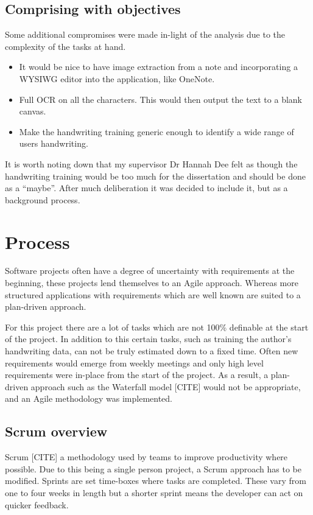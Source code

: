 \subsection{Comprising with objectives}
Some additional compromises were made in-light of the analysis due to the complexity of the tasks at hand.
\begin{itemize}
	\item It would be nice to have image extraction from a note and incorporating a WYSIWG editor into the application, like OneNote.
	\item Full OCR on all the characters. This would then output the text to a blank canvas.
	\item Make the handwriting training generic enough to identify a wide range of users handwriting.
\end{itemize}

It is worth noting down that my supervisor Dr Hannah Dee felt as though the handwriting training would be too much for the dissertation and should be done as a ``maybe''. After much deliberation it was decided to include it, but as a background process.

\section{Process}
Software projects often have a degree of uncertainty with requirements at the beginning, these projects lend themselves to an Agile approach. Whereas more structured applications with requirements which are well known are suited to a plan-driven approach.

For this project there are a lot of tasks which are not 100\% definable at the start of the project. In addition to this certain tasks, such as training the author's handwriting data, can not be truly estimated down to a fixed time. Often new requirements would emerge from weekly meetings and only high level requirements were in-place from the start of the project. As a result, a plan-driven approach such as the Waterfall model [CITE] would not be appropriate, and an Agile methodology was implemented.

\subsection{Scrum overview}
Scrum [CITE] a methodology used by teams to improve productivity where possible. Due to this being a single person project, a Scrum approach has to be modified. Sprints are set time-boxes where tasks are completed. These vary from one to four weeks in length but a shorter sprint means the developer can act on quicker feedback.

